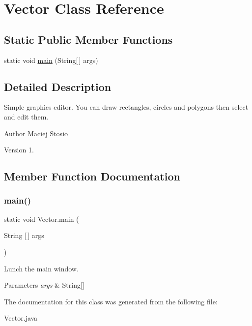 \hypertarget{class_vector}{}\section{Vector Class Reference}
\label{class_vector}
\subsection*{Static Public Member Functions}
\begin{DoxyCompactItemize}
\item 
static void \hyperlink{class_vector_a8cc70560a28244131498b54747e34e96}{main} (String\mbox{[}$\,$\mbox{]} args)
\end{DoxyCompactItemize}


\subsection{Detailed Description}
Simple graphics editor. You can draw rectangles, circles and polygons then select and edit them. \begin{DoxyAuthor}{Author}
Maciej Stosio 
\end{DoxyAuthor}
\begin{DoxyVersion}{Version}
1. 
\end{DoxyVersion}


\subsection{Member Function Documentation}
\mbox{\label{class_vector_a8cc70560a28244131498b54747e34e96}} 
\subsubsection{\texorpdfstring{main()}{main()}}
{\footnotesize\ttfamily static void Vector.\+main (\begin{DoxyParamCaption}\item[{String \mbox{[}$\,$\mbox{]}}]{args }\end{DoxyParamCaption})\hspace{0.3cm}{\ttfamily [static]}}

Lunch the main window. 
\begin{DoxyParams}{Parameters}
{\em args} & String\mbox{[}\mbox{]} \\
\hline
\end{DoxyParams}


The documentation for this class was generated from the following file\+:\begin{DoxyCompactItemize}
\item 
Vector.\+java\end{DoxyCompactItemize}
